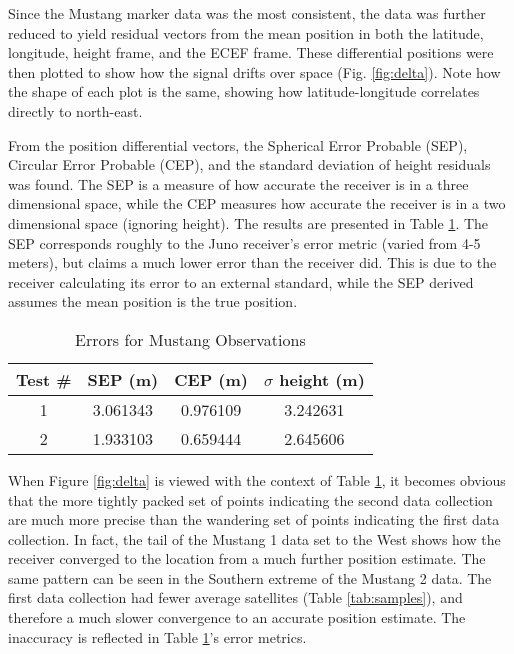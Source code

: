 \documentclass[11pt]{article}
\begin{document}
Since the Mustang marker data was the most consistent, the data was further reduced to yield residual vectors from the mean position in both the latitude, longitude, height frame, and the ECEF frame. These differential positions were then plotted to show how the signal drifts over space (Fig. \ref{fig:delta}). Note how the shape of each plot is the same, showing how latitude-longitude correlates directly to north-east.

From the position differential vectors, the Spherical Error Probable (SEP), Circular Error Probable (CEP), and the standard deviation of height residuals was found. The SEP is a measure of how accurate the receiver is in a three dimensional space, while the CEP measures how accurate the receiver is in a two dimensional space (ignoring height). The results are presented in Table \ref{tab:error}. The SEP corresponds roughly to the Juno receiver's error metric (varied from 4-5 meters), but claims a much lower error than the receiver did. This is due to the receiver calculating its error to an external standard, while the SEP derived assumes the mean position is the true position.

\begin{table}[h]
\centering
\caption{Errors for Mustang Observations}
\label{tab:error}
\begin{tabular}{c|ccc}
Test \#  & SEP (m)  & CEP (m)  & $\sigma$ height (m) \\ \hline
1 & 3.061343 & 0.976109 & 3.242631            \\ \hline
2 & 1.933103 & 0.659444 & 2.645606           
\end{tabular}
\end{table}

When Figure \ref{fig:delta} is viewed with the context of Table \ref{tab:error}, it becomes obvious that the more tightly packed set of points indicating the second data collection are much more precise than the wandering set of points indicating the first data collection. In fact, the tail of the Mustang 1 data set to the West shows how the receiver converged to the location from a much further position estimate. The same pattern can be seen in the Southern extreme of the Mustang 2 data. The first data collection had fewer average satellites (Table \ref{tab:samples}), and therefore a much slower convergence to an accurate position estimate. The inaccuracy is reflected in Table \ref{tab:error}'s error metrics.
\end{document}
